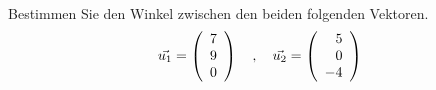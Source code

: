 \begin{aufgabe} ~ \\ 
Bestimmen Sie den Winkel zwischen den beiden folgenden Vektoren.\[\vec{u_1}=\left(\begin{array}{r} 7 \\ 9 \\ 0 \end{array}\right) \quad,\quad \vec{u_2}=\left(\begin{array}{r} 5 \\ 0 \\ -4 \end{array}\right)\]\end{aufgabe} 

